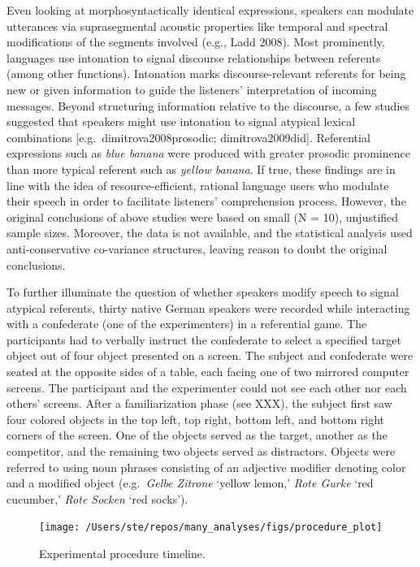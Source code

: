 \documentclass[
  12pt,
]{article}
\begin{document}
Even looking at morphosyntactically identical expressions, speakers can modulate utterances via suprasegmental acoustic properties like temporal and spectral modifications of the segments involved (e.g., Ladd 2008).
Most prominently, languages use intonation to signal discourse relationships between referents (among other functions).
Intonation marks discourse-relevant referents for being new or given information to guide the listeners' interpretation of incoming messages.
Beyond structuring information relative to the discourse, a few studies suggested that speakers might use intonation to signal atypical lexical combinations {[}e.g.~dimitrova2008prosodic; dimitrova2009did{]}.
Referential expressions such as \emph{blue banana} were produced with greater prosodic prominence than more typical referent such as \emph{yellow banana}.
If true, these findings are in line with the idea of resource-efficient, rational language users who modulate their speech in order to facilitate listeners' comprehension process.
However, the original conclusions of above studies were based on small (N = 10), unjustified sample sizes.
Moreover, the data is not available, and the statistical analysis used anti-conservative co-variance structures, leaving reason to doubt the original conclusions.

To further illuminate the question of whether speakers modify speech to signal atypical referents, thirty native German speakers were recorded while interacting with a confederate (one of the experimenters) in a referential game.
The participants had to verbally instruct the confederate to select a specified target object out of four object presented on a screen.
The subject and confederate were seated at the opposite sides of a table, each facing one of two mirrored computer screens.
The participant and the experimenter could not see each other nor each others' screens.
After a familiarization phase (see XXX), the subject first saw four colored objects in the top left, top right, bottom left, and bottom right corners of the screen.
One of the objects served as the target, another as the competitor, and the remaining two objects served as distractors.
Objects were referred to using noun phrases consisting of an adjective modifier denoting color and a modified object (e.g.~\emph{Gelbe Zitrone} `yellow lemon,' \emph{Rote Gurke} `red cucumber,' \emph{Rote Socken} `red socks').



\begin{figure}
\texttt{[image: /Users/ste/repos/many\_analyses/figs/procedure\_plot]} \caption{Experimental procedure timeline.}\label{fig:procedural}
\end{figure}
\end{document}
